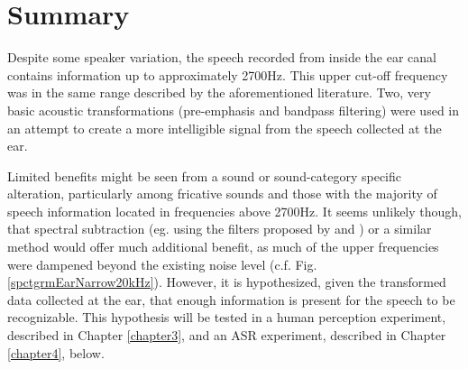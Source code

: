 \section{Summary}\label{chap2:summary}

Despite some speaker variation, the speech recorded from inside the ear canal contains information up to approximately 2700Hz.  This upper cut-off frequency was in the same range described by the aforementioned literature.  Two, very basic acoustic transformations (pre-emphasis and bandpass filtering) were used in an attempt to create a more intelligible signal from the speech collected at the ear.

Limited benefits might be seen from a sound or sound-category specific alteration, particularly among fricative sounds and those with the majority of speech information located in frequencies above 2700Hz.  It seems unlikely though, that spectral subtraction (eg. using the filters proposed by \cite{hansen:97b} and \cite{reinfeldt:10}) or a similar method would offer much additional benefit, as much of the upper frequencies were dampened beyond the existing noise level (c.f. Fig. \ref{spctgrmEarNarrow20kHz}).  However, it is hypothesized, given the transformed data collected at the ear, that enough information is present for the speech to be recognizable.  This hypothesis will be tested in a human perception experiment, described in Chapter \ref{chapter3}, and an ASR experiment, described in Chapter \ref{chapter4}, below.







